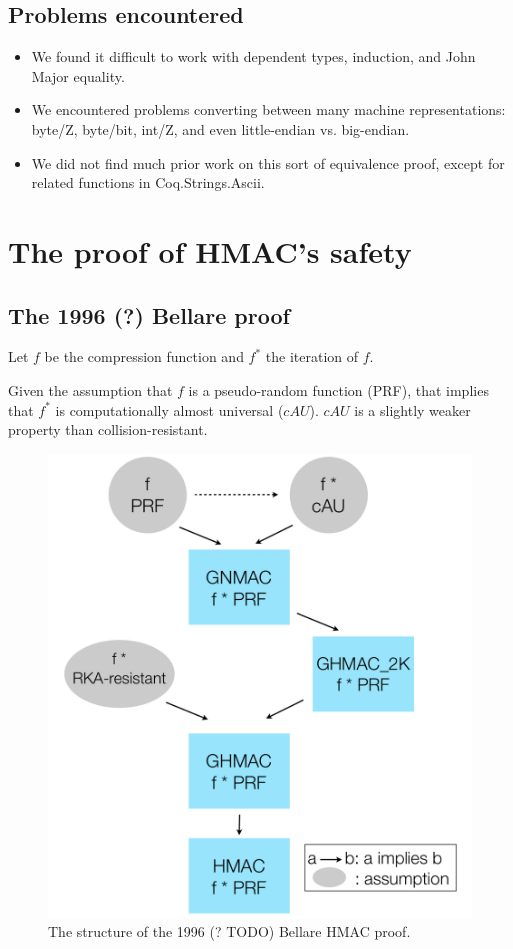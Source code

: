 \documentclass[twocolumn,showpacs,%
  nofootinbib,aps,superscriptaddress,%
  eqsecnum,prd,notitlepage,showkeys,10pt]{revtex4-1}
\begin{document}
\subsection{Problems encountered}

\begin{itemize}
\item We found it difficult to work with dependent types, induction, and John Major equality.
\item We encountered problems converting between many machine representations: byte/Z, byte/bit, int/Z, and even little-endian vs. big-endian.
\item We did not find much prior work on this sort of equivalence proof, except for related functions in Coq.Strings.Ascii.
\end{itemize}

\section{The proof of HMAC's safety}

\subsection{The 1996 (?) Bellare proof}

Let $f$ be the compression function and $f^*$ the iteration of $f$.

Given the assumption that $f$ is a pseudo-random function (PRF), that implies that $f^*$ is computationally almost universal ($cAU$). $cAU$ is a slightly weaker property than collision-resistant.

\begin{figure}[h!]
	\centering
	\includegraphics[scale=0.4]{HMAC_proof}
	\caption{The structure of the 1996 (? TODO) Bellare HMAC proof.}
\end{figure}
\end{document}
